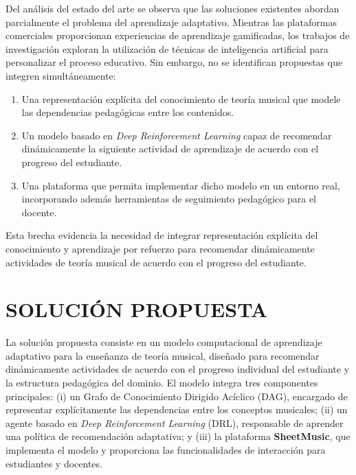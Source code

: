 \documentclass[conference]{IEEEtran}
\begin{document}
Del análisis del estado del arte se observa que las soluciones existentes abordan parcialmente el problema del aprendizaje adaptativo. Mientras las plataformas comerciales proporcionan experiencias de aprendizaje gamificadas, los trabajos de investigación exploran la utilización de técnicas de inteligencia artificial para personalizar el proceso educativo. Sin embargo, no se identifican propuestas que integren simultáneamente:

\begin{enumerate}

\item Una representación explícita del conocimiento de teoría musical que modele las dependencias pedagógicas entre los contenidos.

\item Un modelo basado en \textit{Deep Reinforcement Learning} capaz de recomendar dinámicamente la siguiente actividad de aprendizaje de acuerdo con el progreso del estudiante.

\item Una plataforma que permita implementar dicho modelo en un entorno real, incorporando además herramientas de seguimiento pedagógico para el docente.

\end{enumerate}

Esta brecha evidencia la necesidad de integrar representación explícita del conocimiento y aprendizaje por refuerzo para recomendar dinámicamente actividades de teoría musical de acuerdo con el progreso del estudiante.

\section{SOLUCIÓN PROPUESTA}

La solución propuesta consiste en un modelo computacional de aprendizaje adaptativo para la enseñanza de teoría musical, diseñado para recomendar dinámicamente actividades de acuerdo con el progreso individual del estudiante y la estructura pedagógica del dominio. El modelo integra tres componentes principales: (i) un Grafo de Conocimiento Dirigido Acíclico (DAG), encargado de representar explícitamente las dependencias entre los conceptos musicales; (ii) un agente basado en \textit{Deep Reinforcement Learning} (DRL), responsable de aprender una política de recomendación adaptativa; y (iii) la plataforma \textbf{SheetMusic}, que implementa el modelo y proporciona las funcionalidades de interacción para estudiantes y docentes.
\end{document}
